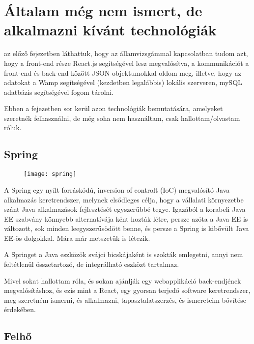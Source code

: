 \chapter{Általam még nem ismert, de alkalmazni kívánt technológiák}\label{ch:ALTALAMNEMISMERT}
\begin{osszefoglal}
az előző fejezetben láthattuk, hogy az államvizsgámmal kapcsolatban tudom azt, hogy a front-end része React.js segítségével lesz megvalósítva, a kommunikációt a front-end és back-end között JSON objektumokkal oldom meg, illetve, hogy az adatokat a Wamp segítségével (kezdetben legalábbis) lokális szerveren, mySQL adatbázis segítségével fogom tárolni.

Ebben a fejezetben sor kerül azon technológiák bemutatására, amelyeket szeretnék felhasználni, de még soha nem használtam, csak hallottam/olvastam róluk.
\end{osszefoglal}

\section{Spring}\label{sec:ALTALAMNEMISMERT:spring}
\begin{figure}[h]
	\centering
	\texttt{[image: spring]}
\end{figure}
A Spring egy nyílt forráskódú, inversion of controlt (IoC) megvalósító Java alkalmazás keretrendszer, melynek elsődleges célja, hogy a vállalati környezetbe szánt Java alkalmazások fejlesztését egyszerűbbé tegye. Igazából a korabeli Java EE szabvány könnyebb alternatívája ként hozták létre, persze azóta a Java EE is változott, sok minden leegyszerűsödött benne, és persze a Spring is kibővült Java EE-ös dolgokkal. Mára már metszetük is létezik.

A Springet a Java eszközök svájci bicskájaként is szokták emlegetni, annyi nem feltétlenül összetartozó, de integrálható eszközt tartalmaz.

Mivel sokat hallottam róla, és sokan ajánlják egy webapplikáció back-endjének megvalósításhoz, és ezis mint a React, egy gyorsan terjedő software keretrendszer, meg szeretném ismerni, és alkalmazni, tapasztalatszerzés, és ismereteim bővítése érdekében.

\section{Felhő}\label{sec:ALTALAMNEMISMERT:felho}

